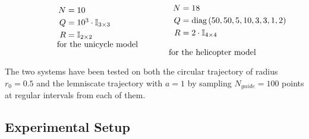 \documentclass[../main.tex]{subfiles}
\begin{document}
\[
\begin{minipage}{.2\textwidth}
\end{minipage}%
\begin{minipage}{.3\textwidth}
  $\begin{array}{r@{{}\mathrel{=}{}}l}
	  N & 10 \\[\jot]
	  Q & 10^3 \cdot \mbb{I}_{3 \times 3} \\[\jot]
	  R & \mbb{I}_{2 \times 2}
  \end{array}$\\
	\vspace{0.25cm}
  \text{for the unicycle model}
\end{minipage}%
\begin{minipage}{.10\textwidth}
\quad
\end{minipage}%
\begin{minipage}{.3\textwidth}
  $\begin{array}{r@{{}\mathrel{=}{}}l}
	N & 18 \\[\jot] 
	Q & \text{diag}\left(50, 50, 5, 10, 3, 3, 1, 2\right) \\[\jot]
	R & 2 \cdot \mbb{I}_{4 \times 4}
  \end{array}$\\
  \vspace{0.25cm}
  \text{for the helicopter model}
\end{minipage}%
\]

The two systems have been tested on both the circular trajectory of radius $r_0
= 0.5$ and the lemniscate trajectory with $a = 1$ by sampling $N_{guide} = 100$
points at regular intervals from each of them.

\subsection{Experimental Setup}
\end{document}
